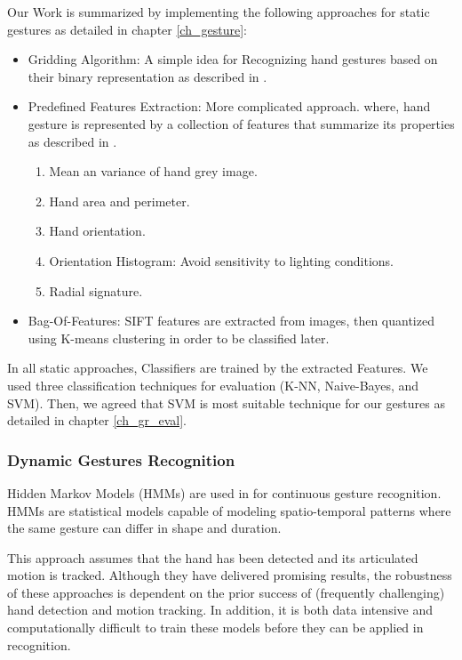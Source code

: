 Our Work is summarized by implementing the following approaches for static gestures as detailed in chapter \ref{ch_gesture}:
\begin{itemize}
\item Gridding Algorithm: A simple idea for Recognizing hand gestures based on their binary representation as described in \cite{paper1sb}.
\bigskip

\item Predefined Features Extraction: More complicated approach. where, hand gesture is represented by a collection of features that summarize its properties as described in \cite{paper2sT}.
\begin{enumerate}
\item Mean an variance of hand grey image.
\item Hand area and perimeter.
\item Hand orientation.
\item Orientation Histogram: Avoid sensitivity to lighting conditions. 
\item Radial signature.
\end{enumerate}
\bigskip

\item Bag-Of-Features: SIFT features are extracted from images, then quantized using K-means clustering in order to be classified later.
\end{itemize}
\bigskip

In all static approaches, Classifiers are trained by the extracted Features. 
We used three classification techniques for evaluation (K-NN, Naive-Bayes, and SVM). Then, we agreed that SVM is most suitable technique for our gestures as detailed in chapter \ref{ch_gr_eval}.

\subsubsection{Dynamic Gestures Recognition} 
Hidden Markov Models (HMMs) are used in \cite{hoda} for continuous gesture recognition. HMMs are statistical models capable of modeling spatio-temporal patterns where the same gesture can differ in shape and duration.
\bigskip

This approach assumes that the hand has been detected and its articulated motion is tracked. Although they have delivered promising results, the robustness of these approaches is dependent on the prior success of (frequently challenging) hand detection and motion tracking. In addition, it is both data intensive and computationally difficult to train these models before they can be applied in recognition.
\bigskip

